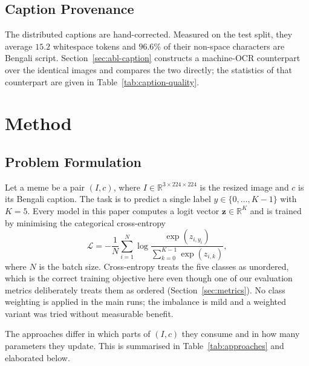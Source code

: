 \documentclass[conference]{IEEEtran}
\begin{document}
\subsection{Caption Provenance}
\label{sec:dataset-captions}

The distributed captions are hand-corrected. Measured on the test split, they
average $15.2$ whitespace tokens and $96.6\%$ of their non-space characters are
Bengali script. Section~\ref{sec:abl-caption} constructs a machine-OCR
counterpart over the identical images and compares the two directly; the
statistics of that counterpart are given in Table~\ref{tab:caption-quality}.

\section{Method}
\label{sec:method}

\subsection{Problem Formulation}
\label{sec:formulation}

Let a meme be a pair $(I, c)$, where $I \in \mathbb{R}^{3 \times 224 \times 224}$
is the resized image and $c$ is its Bengali caption. The task is to predict a
single label $y \in \{0,\dots,K-1\}$ with $K=5$. Every model in this paper
computes a logit vector $\bm{z} \in \mathbb{R}^{K}$ and is trained by minimising
the categorical cross-entropy
\begin{equation}
\mathcal{L} = -\frac{1}{N}\sum_{i=1}^{N} \log \frac{\exp(z_{i,y_i})}{\sum_{k=0}^{K-1}\exp(z_{i,k})} ,
\label{eq:ce}
\end{equation}
where $N$ is the batch size. Cross-entropy treats the five classes as unordered,
which is the correct training objective here even though one of our evaluation
metrics deliberately treats them as ordered
(Section~\ref{sec:metrics}). No class weighting is applied in the main runs; the
imbalance is mild and a weighted variant was tried without measurable benefit.

The approaches differ in which parts of $(I,c)$ they consume and in how many
parameters they update. This is summarised in Table~\ref{tab:approaches} and
elaborated below.
\end{document}

